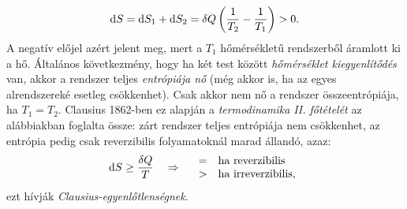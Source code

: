 \begin{align}
	\mathrm{d}S = \mathrm{d}S_1+\mathrm{d}S_2 =\delta Q\left({\frac{1}{T_2}-\frac{1}{T_1}}\right)>0.
\end{align}
A negatív előjel azért jelent meg, mert a $T_1$ hőmérsékletű rendszerből áramlott ki a hő. Általános következmény, hogy ha két test között \emph{hőmérséklet kiegyenlítődés} van, akkor a rendszer teljes \emph{entrópiája nő} (még akkor is, ha az egyes alrendszereké esetleg csökkenhet). Csak akkor nem nő a rendszer összeentrópiája, ha $T_1=T_2$. Clausius 1862-ben ez alapján a \emph{termodinamika II. főtételét} az alábbiakban foglalta össze: zárt rendszer teljes entrópiája nem csökkenhet, az entrópia pedig csak reverzibilis folyamatoknál marad állandó, azaz:
\begin{align}
	\mathrm{d}S \geq \frac{\delta Q}{T} \quad\Rightarrow\quad
\begin{array}{rl}
=&\textnormal{ha reverzibilis}\\
>&\textnormal{ha irreverzibilis},
\end{array}
\end{align}
ezt hívják \emph{Clausius-egyenlőtlenségnek}.

